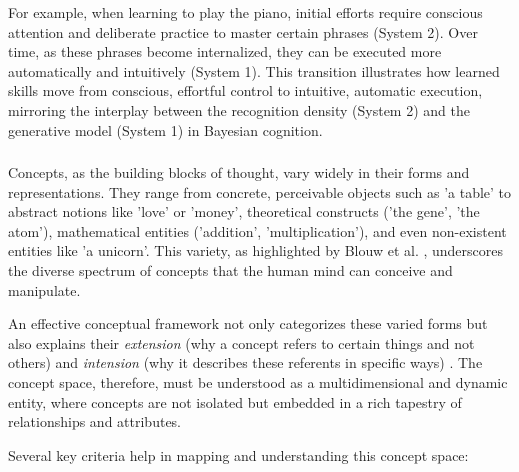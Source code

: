 For example, when learning to play the piano, initial efforts require conscious attention and deliberate practice to master certain phrases (System 2). Over time, as these phrases become internalized, they can be executed more automatically and intuitively (System 1). This transition illustrates how learned skills move from conscious, effortful control to intuitive, automatic execution, mirroring the interplay between the recognition density (System 2) and the generative model (System 1) in Bayesian cognition.


\subsubsection{}
Concepts, as the building blocks of thought, vary widely in their forms and representations. They range from concrete, perceivable objects such as 'a table' to abstract notions like 'love' or 'money', theoretical constructs ('the gene', 'the atom'), mathematical entities ('addition', 'multiplication'), and even non-existent entities like 'a unicorn'. This variety, as highlighted by Blouw et al. \cite{blouw2016concepts}, underscores the diverse spectrum of concepts that the human mind can conceive and manipulate.

An effective conceptual framework not only categorizes these varied forms but also explains their \emph{extension} (why a concept refers to certain things and not others) and \emph{intension} (why it describes these referents in specific ways) \cite{ball2013surfaces}. The concept space, therefore, must be understood as a multidimensional and dynamic entity, where concepts are not isolated but embedded in a rich tapestry of relationships and attributes.

Several key criteria help in mapping and understanding this concept space:

